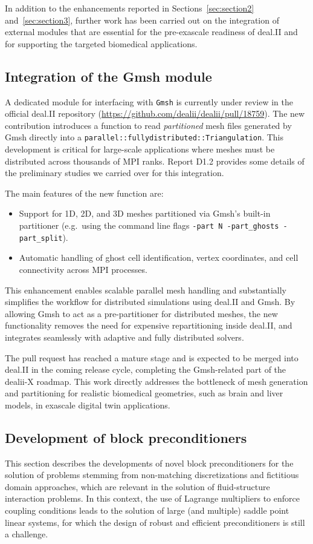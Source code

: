 \documentclass[a4paper,12pt]{article}
\begin{document}
In addition to the enhancements reported in Sections~\ref{sec:section2} and~\ref{sec:section3},
further work has been carried out on the integration of external modules that are
essential for the pre-exascale readiness of deal.II and for supporting the
targeted biomedical applications.

\subsection{Integration of the Gmsh module}

A dedicated module for interfacing with \texttt{Gmsh} is currently under
review in the official deal.II repository
(\url{https://github.com/dealii/dealii/pull/18759}).  
The new contribution introduces a function to read \emph{partitioned} mesh files
generated by Gmsh directly into a \texttt{parallel::fullydistributed::Triangulation}.
This development is critical for large-scale applications where meshes must be
distributed across thousands of MPI ranks. Report D1.2 provides some details of the preliminary studies we carried over for this integration.

The main features of the new function are:
\begin{itemize}
  \item Support for 1D, 2D, and 3D meshes partitioned via Gmsh's built-in
        partitioner (e.g.\ using the command line flags
        \verb|-part N -part_ghosts -part_split|).
  \item Automatic handling of ghost cell identification, vertex coordinates,
        and cell connectivity across MPI processes.
\end{itemize}

This enhancement enables scalable parallel mesh handling and substantially
simplifies the workflow for distributed simulations using deal.II and Gmsh.
By allowing Gmsh to act as a pre-partitioner for distributed meshes, the new
functionality removes the need for expensive repartitioning inside deal.II,
and integrates seamlessly with adaptive and fully distributed solvers.  

The pull request has reached a mature stage and is expected to be merged into
deal.II in the coming release cycle, completing the Gmsh-related part of the
dealii-X roadmap. This work directly addresses the bottleneck of mesh generation
and partitioning for realistic biomedical geometries, such as brain and liver
models, in exascale digital twin applications.


\subsection{Development of block preconditioners}
\label{sec:preconditioning}
This section describes the developments of novel block preconditioners for the solution of problems stemming from
non-matching discretizations and fictitious domain approaches, which are relevant in the solution
of fluid-structure interaction problems. In this context, the use of Lagrange multipliers to enforce coupling conditions
leads to the solution of large (and multiple) saddle point linear systems, for which the design of robust and
efficient preconditioners is still a challenge.
\end{document}
